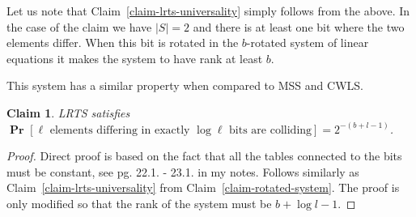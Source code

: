 \documentclass{article}
\newcommand{\probs}[2]{\operatorname{\mathbf{Pr}}_{{#1}}\left[{#2}\right]}
\newcommand{\prob}[1]{\probs{}{#1}}
\newtheorem{claim}{Claim}
\begin{document}
Let us note that Claim~\ref{claim-lrts-universality} simply follows from the above. In the case of the claim we have $|S| = 2$ and there is at least one bit where the two elements differ.
When this bit is rotated in the $b$-rotated system of linear equations it makes the system to have rank at least $b$.

This system has a similar property when compared to MSS and CWLS.
\begin{claim}
LRTS satisfies $\prob{\ell \mbox{ elements differing in exactly } \log \ell \mbox{ bits are colliding}} = 2^{-(b + l - 1)}$.
\end{claim}
\begin{proof}
Direct proof is based on the fact that all the tables connected to the bits must be constant, see pg. 22.1. - 23.1. in my notes. Follows similarly as Claim~\ref{claim-lrts-universality} from Claim~\ref{claim-rotated-system}.
The proof is only modified so that the rank of the system must be $b + \log l - 1$.
\end{proof}



\end{document}

